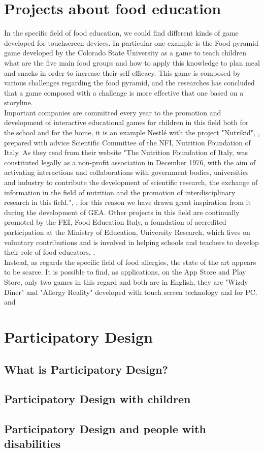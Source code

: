 \section{Projects about food education}
In the specific field of food education, we could find different kinds of game developed for touchscreen devices. In particular one example is the Food pyramid game developed by the Colorado State University \cite{Serrano} as a game to teach children what are the five main food groups and how to apply this knowledge to plan meal and snacks in order to increase their self-efficacy. This game is composed by various challenges regarding the food pyramid, and the researches has concluded that a game composed with a challenge is more effective that one based on a storyline.\\
Important companies are committed every year to the promotion and development of interactive educational games for children in this field both for the school and for the home, it is an example Nestl\'e with the project "Nutrikid", \cite{Nutrikid}, prepared with advice Scientific Committee of the NFI, Nutrition Foundation of Italy. As they read from their website "The Nutrition Foundation of Italy, was constituted legally as a non-profit association in December 1976, with the aim of activating interactions and collaborations with government bodies, universities and industry to contribute the development of scientific research, the exchange of information in the field of nutrition and the promotion of interdisciplinary research in this field.", \cite{NFI}, for this reason we have drawn great inspiration from it during the development of GEA. Other projects in this field are continually promoted by the FEI, Food Education Italy, a foundation of accredited participation at the Ministry of Education, University Research, which lives on voluntary contributions and is involved in helping schools and teachers to develop their role of food educators, \cite{FEI}.\\
Instead, as regards the specific field of food allergies, the state of the art appears to be scarce. It is possible to find, as applications, on the App Store and Play Store, only two games in this regard and both are in English, they are "Wizdy Diner" and "Allergy Reality" developed with touch screen technology and for PC. \cite{Wizdy} and \cite{Allergy}

\section{Participatory Design}
\subsection{What is Participatory Design?}
\subsection{Participatory Design with children}
\subsection{Participatory Design and people with disabilities}
